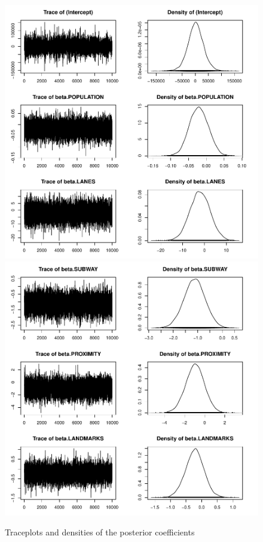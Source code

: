 \documentclass[12pt]{article}
\begin{document}
\begin{figure}[H]
		\centering
		\includegraphics[scale=0.55]{Pictures/beta_1.pdf}
		\includegraphics[scale=0.55]{Pictures/beta_2.pdf}
		\caption{Traceplots and densities of the posterior coefficients}
\end{figure}
\end{document}
